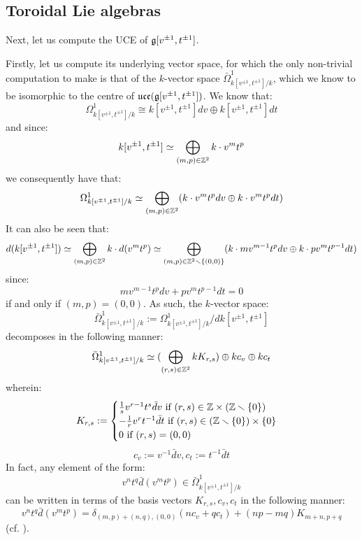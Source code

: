     \subsection{Toroidal Lie algebras}
        \begin{example} \label{example: toroidal_lie_algebras_centres}
            Next, let us compute the UCE of $\mathfrak{g}[v^{\pm 1}, t^{\pm 1}]$. 
            
            Firstly, let us compute its underlying vector space, for which the only non-trivial computation to make is that of the $k$-vector space $\bar{\Omega}^1_{k[v^{\pm 1}, t^{\pm 1}]/k}$, which we know to be isomorphic to the centre of $\mathfrak{uce}(\mathfrak{g}[v^{\pm 1}, t^{\pm 1}])$. We know that:
                $$\Omega^1_{k[v^{\pm 1}, t^{\pm 1}]/k} \cong k[v^{\pm 1}, t^{\pm 1}] dv \oplus k[v^{\pm 1}, t^{\pm 1}] dt$$
            and since:
                $$k[v^{\pm 1}, t^{\pm 1}] \simeq \bigoplus_{(m, p) \in \mathbb{Z}^2} k \cdot v^m t^p$$
            we consequently have that:
                $$\Omega^1_{k[v^{\pm 1}, t^{\pm 1}]/k} \simeq \bigoplus_{(m, p) \in \mathbb{Z}^2} (k \cdot v^m t^p dv \oplus k \cdot v^m t^p dt)$$
            It can also be seen that:
                $$d(k[v^{\pm 1}, t^{\pm 1}]) \simeq \bigoplus_{(m, p) \in \mathbb{Z}^2} k \cdot d(v^m t^p) \simeq \bigoplus_{(m, p) \in \mathbb{Z}^2 \smallsetminus \{(0, 0)\}} ( k \cdot m v^{m - 1} t^p dv \oplus k \cdot p v^m t^{p - 1} dt )$$
            since:
                $$m v^{m - 1} t^p dv + p v^m t^{p - 1} dt = 0$$
            if and only if $(m, p) = (0, 0)$. As such, the $k$-vector space:
                $$\bar{\Omega}^1_{k[v^{\pm 1}, t^{\pm 1}]/k} := \Omega^1_{k[v^{\pm 1}, t^{\pm 1}]/k}/d k[v^{\pm 1}, t^{\pm 1}]$$
            decomposes in the following manner:
                $$\bar{\Omega}^1_{k[v^{\pm 1}, t^{\pm 1}]/k} \simeq ( \bigoplus_{(r, s) \in \mathbb{Z}^2} k K_{r, s}) \oplus k c_v \oplus k c_t$$
            wherein:
                $$
                    K_{r, s} :=
                    \begin{cases}
                        \text{$\frac1s v^{r - 1} t^s \bar{d}v$ if $(r, s) \in \Z \x (\Z \setminus \{0\})$}
                        \\
                        \text{$-\frac1r v^r t^{-1} \bar{d}t$ if $(r, s) \in (\Z \setminus \{0\}) \x \{0\}$}
                        \\
                        \text{$0$ if $(r, s) = (0, 0)$}
                    \end{cases}
                $$
                $$c_v := v^{-1} \bar{d}v, c_t := t^{-1} \bar{d}t$$
            In fact, any element of the form:
                $$v^n t^q \bar{d}(v^m t^p) \in \bar{\Omega}^1_{k[v^{\pm 1}, t^{\pm 1}]/k}$$
            can be written in terms of the basis vectors $K_{r, s}, c_v, c_t$ in the following manner:
                $$v^n t^q \bar{d}(v^m t^p) = \delta_{(m, p) + (n, q), (0, 0)} ( n c_v + q c_t ) + (np - mq) K_{m + n, p + q}$$
            (cf. \cite[pp. 35]{wendlandt_formal_shift_operators_on_yangian_doubles}).


\end{example}
